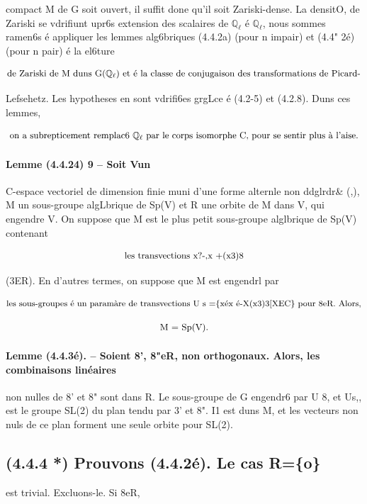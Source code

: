 \documentclass[11pt]{article}
\theoremstyle{remark}
\begin{document}
compact M de G soit ouvert, il suffit done qu'il soit Zariski-dense. La densitO, de Zariski se vdrifiunt upr6s extension des scalaires de \(\mathbb{Q}_{\ell}\) é \(\mathbb{Q}_{\ell}\), nous sommes ramen6s é appliquer les lemmes alg6briques (4.4.2a) (pour n impair) et (4.4" 2é) (pour n pair) é la el6ture

\[\text{\small de Zariski de M duns G(\(\mathbb{Q}_{\ell}\)) et é la classe de conjugaison des transformations de Picard-}\]

Lefsehetz. Les hypotheses en sont vdrifi6es grgLce é (4.2-5) et (4.2.8). Duns ces lemmes,

\[\text{\small on a subrepticement remplac6 \(\mathbb{Q}_{\ell}\) par le corps isomorphe C, pour se sentir plus à l'aise.}\]

\paragraph{Lemme (4.4.24)  9 -- Soit Vun}

C-espace vectoriel de dimension finie muni d'une forme alternle non ddglrdr\& (,), M un sous-groupe algLbrique de Sp(V) et R une orbite de M dans V, qui engendre V. On suppose que M est le plus petit sous-groupe alglbrique de Sp(V) contenant

\[\text{\small les transvections x?-,x +(x3)8}\]

(3ER). En d'autres termes, on suppose que M est engendrl par

\[\text{\small les sous-groupes é un paramàre de transvections U s =\{xéx é-X(x3)3[XEC\} pour 8eR. Alors,}\]

\[\text{\small M = Sp(V).}\]

\paragraph{Lemme (4.4.3é). -- Soient 8', 8"eR, non orthogonaux. Alors, les combinaisons linéaires}

non nulles de 8' et 8" sont dans R. Le sous-groupe de G engendr6 par U 8, et Us,, est le groupe SL(2) du plan tendu par 3' et 8". I1 est duns M, et les vecteurs non nuls de ce plan forment une seule orbite pour SL(2).

\subsection*{(4.4.4 *) Prouvons (4.4.2é). Le cas R=\{o\}}

est trivial. Excluons-le. Si 8eR,
\end{document}
